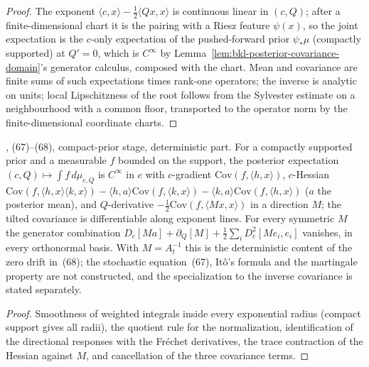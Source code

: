 \begin{proof}
  \leanok
  The exponent $\langle c,x\rangle-\tfrac12\langle Qx,x\rangle$ is continuous linear in $(c,Q)$; after a
  finite-dimensional chart it is the pairing with a Riesz feature $\psi(x)$, so the joint expectation is
  the $c$-only expectation of the pushed-forward prior $\psi_*\mu$ (compactly supported) at $Q'=0$, which
  is $C^\infty$ by Lemma~\ref{lem:bkl-posterior-covariance-domain}'s generator calculus, composed with the
  chart.  Mean and covariance are finite sums of such expectations times rank-one operators; the inverse
  is analytic on units; local Lipschitzness of the root follows from the Sylvester estimate on a
  neighbourhood with a common floor, transported to the operator norm by the finite-dimensional
  coordinate charts.
\end{proof}

\begin{lemma}
  \label{lem:bkl-posterior-generator}
  \leanok
  \cite{BizeulKlartagLehec2026}, (67)--(68), compact-prior stage, deterministic part.  For a
  compactly supported prior and a measurable $f$ bounded on the support, the posterior expectation
  $(c,Q)\mapsto\int f\,d\mu_{c,Q}$ is $C^\infty$ in $c$ with $c$-gradient $\mathrm{Cov}(f,\langle h,x\rangle)$,
  $c$-Hessian $\mathrm{Cov}(f,\langle h,x\rangle\langle k,x\rangle)-\langle h,a\rangle\mathrm{Cov}(f,\langle k,x\rangle)
  -\langle k,a\rangle\mathrm{Cov}(f,\langle h,x\rangle)$ ($a$ the posterior mean), and $Q$-derivative
  $-\tfrac12\mathrm{Cov}(f,\langle Mx,x\rangle)$ in a direction $M$; the tilted covariance is differentiable
  along exponent lines.  For every symmetric $M$ the generator combination
  $D_c[Ma]+\partial_Q[M]+\tfrac12\sum_i D^2_c[Me_i,e_i]$ vanishes, in every orthonormal basis.
  With $M=A_t^{-1}$ this is the deterministic content of the zero drift in~(68); the stochastic
  equation~(67), It\^o's formula and the martingale property are not constructed, and the
  specialization to the inverse covariance is stated separately.
\end{lemma}
\begin{proof}
  \leanok
  Smoothness of weighted integrals inside every exponential radius (compact support gives all
  radii), the quotient rule for the normalization, identification of the directional responses with
  the Fr\'echet derivatives, the trace contraction of the Hessian against $M$, and cancellation of
  the three covariance terms.
\end{proof}

